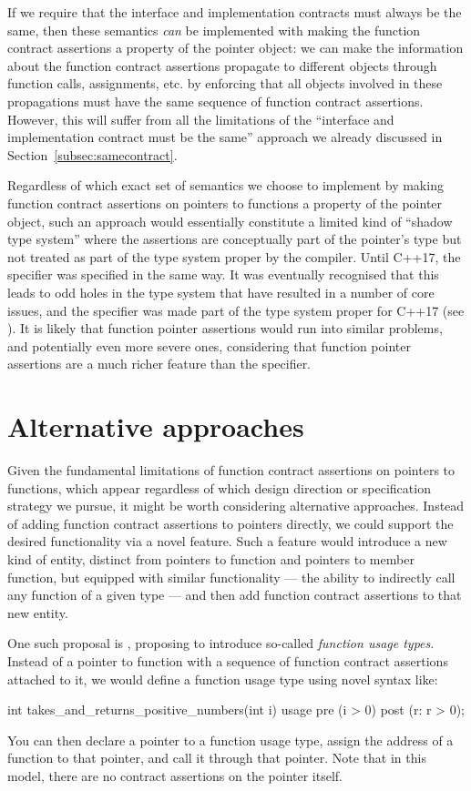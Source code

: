 If we require that the interface and implementation contracts must always be the same, then these semantics \emph{can} be implemented with making the function contract assertions a property of the pointer object: we can make the information about the function contract assertions propagate to different objects through function calls, assignments, etc. by enforcing that all objects involved in these propagations must have the same sequence of function contract assertions. However, this will suffer from all the limitations of the ``interface and implementation contract must be the same'' approach we already discussed in Section~\ref{subsec:samecontract}.

Regardless of which exact set of semantics we choose to implement by making function contract assertions on pointers to functions a property of the pointer object, such an approach would essentially constitute a limited kind of ``shadow type system'' where the assertions are conceptually part of the pointer's type but not treated as part of the type system proper by the compiler. Until C++17, the  specifier was specified in the same way. It was eventually recognised that this leads to odd holes in the type system that have resulted in a number of core issues, and the  specifier was made part of the type system proper for C++17 (see \cite{P0012R1}). It is likely that function pointer assertions would run into similar problems, and potentially even more severe ones, considering that function pointer assertions are a much richer feature than the  specifier.

\section{Alternative approaches}

Given the fundamental limitations of function contract assertions on pointers to functions, which appear regardless of which design direction or specification strategy we pursue, it might be worth considering alternative approaches. Instead of adding function contract assertions to pointers directly, we could support the desired functionality via a novel feature. Such a feature would  introduce a new kind of entity, distinct from pointers to function and pointers to member function, but equipped with similar functionality --- the ability to indirectly call any function of a given type --- and then add function contract assertions to that new entity.

One such proposal is \cite{P3271R0}, proposing to introduce so-called \emph{function usage types}. Instead of a pointer to function with a sequence of function contract assertions attached to it, we would define a function usage type using novel syntax like:
\begin{codeblock}
int takes_and_returns_positive_numbers(int i) usage 
  pre (i > 0)
  post (r: r > 0);
\end{codeblock}
You can then declare a pointer to a function usage type, assign the address of a function to that pointer, and call it through that pointer. Note that in this model, there are no contract assertions on the pointer itself.


